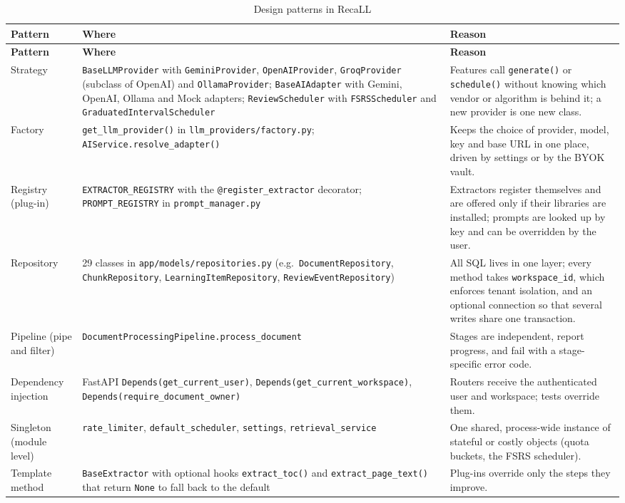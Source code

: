{\small
\begin{longtable}{@{}p{}p{}p{}@{}}
\caption{Design patterns in RecaLL}\label{tab:patterns}\\
\toprule
\textbf{Pattern} & \textbf{Where} & \textbf{Reason}\\
\midrule
\endfirsthead
\toprule
\textbf{Pattern} & \textbf{Where} & \textbf{Reason}\\
\midrule
\endhead
\bottomrule
\endfoot
Strategy & \texttt{BaseLLMProvider} with \texttt{GeminiProvider}, \texttt{OpenAIProvider}, \texttt{GroqProvider} (subclass of OpenAI) and \texttt{OllamaProvider}; \texttt{BaseAIAdapter} with Gemini, OpenAI, Ollama and Mock adapters; \texttt{ReviewScheduler} with \texttt{FSRSScheduler} and \texttt{GraduatedIntervalScheduler} & Features call \texttt{generate()} or \texttt{schedule()} without knowing which vendor or algorithm is behind it; a new provider is one new class.\\
Factory & \texttt{get\_llm\_provider()} in \texttt{llm\_providers/factory.py}; \texttt{AIService.resolve\_adapter()} & Keeps the choice of provider, model, key and base URL in one place, driven by settings or by the BYOK vault.\\
Registry (plug-in) & \texttt{EXTRACTOR\_REGISTRY} with the \texttt{@register\_extractor} decorator; \texttt{PROMPT\_REGISTRY} in \texttt{prompt\_manager.py} & Extractors register themselves and are offered only if their libraries are installed; prompts are looked up by key and can be overridden by the user.\\
Repository & 29 classes in \texttt{app/models/repositories.py} (e.g.\ \texttt{DocumentRepository}, \texttt{ChunkRepository}, \texttt{LearningItemRepository}, \texttt{ReviewEventRepository}) & All SQL lives in one layer; every method takes \texttt{workspace\_id}, which enforces tenant isolation, and an optional connection so that several writes share one transaction.\\
Pipeline (pipe and filter) & \texttt{DocumentProcessingPipeline.}\allowbreak\texttt{process\_document} & Stages are independent, report progress, and fail with a stage-specific error code.\\
Dependency injection & FastAPI \texttt{Depends(get\_current\_user)}, \texttt{Depends(get\_current\_workspace)}, \texttt{Depends(require\_document\_owner)} & Routers receive the authenticated user and workspace; tests override them.\\
Singleton (module level) & \texttt{rate\_limiter}, \texttt{default\_scheduler}, \texttt{settings}, \texttt{retrieval\_service} & One shared, process-wide instance of stateful or costly objects (quota buckets, the FSRS scheduler).\\
Template method & \texttt{BaseExtractor} with optional hooks \texttt{extract\_toc()} and \texttt{extract\_page\_text()} that return \texttt{None} to fall back to the default & Plug-ins override only the steps they improve.\\
\end{longtable}
}


